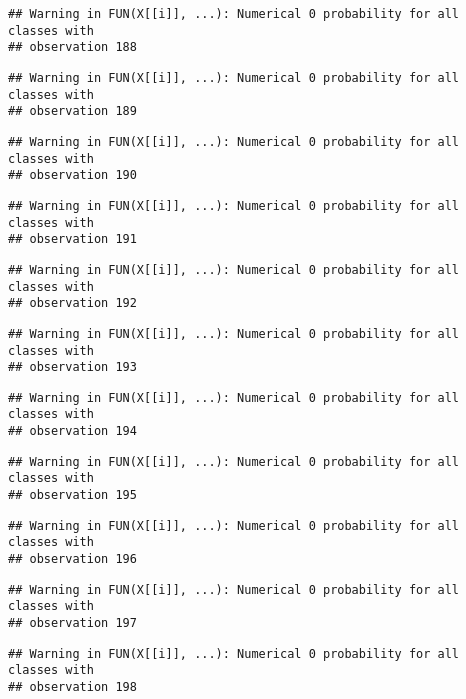 \documentclass[
]{article}
\begin{document}
\begin{verbatim}
## Warning in FUN(X[[i]], ...): Numerical 0 probability for all classes with
## observation 188
\end{verbatim}

\begin{verbatim}
## Warning in FUN(X[[i]], ...): Numerical 0 probability for all classes with
## observation 189
\end{verbatim}

\begin{verbatim}
## Warning in FUN(X[[i]], ...): Numerical 0 probability for all classes with
## observation 190
\end{verbatim}

\begin{verbatim}
## Warning in FUN(X[[i]], ...): Numerical 0 probability for all classes with
## observation 191
\end{verbatim}

\begin{verbatim}
## Warning in FUN(X[[i]], ...): Numerical 0 probability for all classes with
## observation 192
\end{verbatim}

\begin{verbatim}
## Warning in FUN(X[[i]], ...): Numerical 0 probability for all classes with
## observation 193
\end{verbatim}

\begin{verbatim}
## Warning in FUN(X[[i]], ...): Numerical 0 probability for all classes with
## observation 194
\end{verbatim}

\begin{verbatim}
## Warning in FUN(X[[i]], ...): Numerical 0 probability for all classes with
## observation 195
\end{verbatim}

\begin{verbatim}
## Warning in FUN(X[[i]], ...): Numerical 0 probability for all classes with
## observation 196
\end{verbatim}

\begin{verbatim}
## Warning in FUN(X[[i]], ...): Numerical 0 probability for all classes with
## observation 197
\end{verbatim}

\begin{verbatim}
## Warning in FUN(X[[i]], ...): Numerical 0 probability for all classes with
## observation 198
\end{verbatim}
\end{document}
